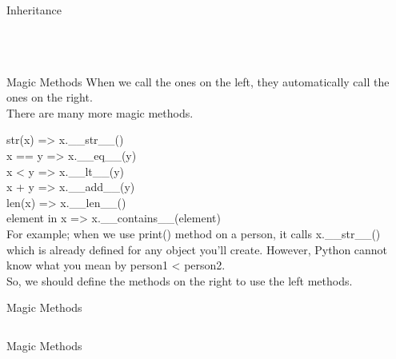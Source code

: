         \begin{frame}{Inheritance}
            \small \inputminted[frame=single,framesep=1pt, lastline = 20]{python3}{code_examples/inheritance2.py}
            \begin{columns}
                \begin{column}{0.47\textwidth}
                    \small \inputminted[frame=single,framesep=1pt, lastline = 20]{python3}{code_examples/inheritance3.py}
                \end{column}
                \begin{column}{0.53\textwidth}
                    \small \inputminted[frame=single,framesep=1pt, lastline = 20]{python3}{code_examples/inheritance4.py}
                \end{column}
            \end{columns}
        \end{frame}

        \begin{frame}{Magic Methods}
            When we call the ones on the left, they automatically call the ones on the right.\\
            There are many more magic methods.

            str(x) =\textgreater{} x.\_\_str\_\_()\\
            x == y =\textgreater{} x.\_\_eq\_\_(y)\\
            x \textless{} y =\textgreater{} x.\_\_lt\_\_(y)\\
            x + y =\textgreater{} x.\_\_add\_\_(y)\\
            len(x) =\textgreater{} x.\_\_len\_\_()\\
            element in x =\textgreater{} x.\_\_contains\_\_(element)\\

            For example; when we use print() method on a person, it calls x.\_\_str\_\_() which is already defined for any object you'll create.
            However, Python cannot know what you mean by person1 \textless{} person2. \\

            So, we should define the methods on the right to use the left methods.
        \end{frame}

        \begin{frame}{Magic Methods}
            \inputminted[frame=single,framesep=1pt, lastline = 20]{python3}{code_examples/magic.py}
        \end{frame}

        \begin{frame}{Magic Methods}
            \inputminted[frame=single,framesep=1pt, lastline = 20]{python3}{code_examples/magic2.py}
        \end{frame}
